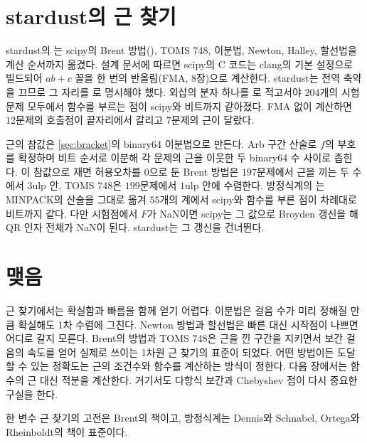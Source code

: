 \section{stardust의 근 찾기}
\label{sec:roots-stardust}

\begin{instardust}
stardust의 는 scipy의 Brent 방법(), TOMS 748, 이분법, Newton, Halley, 할선법을 계산 순서까지 옮겼다. 설계 문서에 따르면 scipy의 C 코드는 clang의 기본 설정으로 빌드되어 $ab+c$ 꼴을 한 번의 반올림(FMA, 8장)으로 계산한다. stardust는 전역 축약을 끄므로 그 자리를 로 명시해야 했다. 외삽의 분자 하나를 로 적고서야 $204$개의 시험 문제 모두에서 함수를 부르는 점이 scipy와 비트까지 같아졌다. FMA 없이 계산하면 $12$문제의 호출점이 끝자리에서 갈리고 $7$문제의 근이 달랐다.
\end{instardust}

\begin{instardust}
근의 참값은 \cref{sec:bracket}의 binary64 이분법으로 만든다. Arb 구간 산술로 $f$의 부호를 확정하며 비트 순서로 이분해 각 문제의 근을 이웃한 두 binary64 수 사이로 좁힌다. 이 참값으로 재면 허용오차를 $0$으로 둔 Brent 방법은 $197$문제에서 근을 끼는 두 수에서 $3$ulp 안, TOMS 748은 $199$문제에서 $1$ulp 안에 수렴한다. 방정식계의 는 MINPACK의 산술을 그대로 옮겨 $55$개의 계에서 scipy와 함수를 부른 점이 차례대로 비트까지 같다. 다만 시험점에서 $F$가 NaN이면 scipy는 그 값으로 Broyden 갱신을 해 QR 인자 전체가 NaN이 된다. stardust는 그 갱신을 건너뛴다.
\end{instardust}

\section{맺음}

근 찾기에서는 확실함과 빠름을 함께 얻기 어렵다. 이분법은 걸음 수가 미리 정해질 만큼 확실해도 1차 수렴에 그친다. Newton 방법과 할선법은 빠른 대신 시작점이 나쁘면 어디로 갈지 모른다. Brent의 방법과 TOMS 748은 근을 낀 구간을 지키면서 보간 걸음의 속도를 얻어 실제로 쓰이는 1차원 근 찾기의 표준이 되었다. 어떤 방법이든 도달할 수 있는 정확도는 근의 조건수와 함수를 계산하는 방식이 정한다. 다음 장에서는 함수의 근 대신 적분을 계산한다. 거기서도 다항식 보간과 Chebyshev 점이 다시 중요한 구실을 한다.

한 변수 근 찾기의 고전은 Brent의 책\cite{brent1973}이고, 방정식계는 Dennis와 Schnabel\cite{dennis1996}, Ortega와 Rheinboldt\cite{ortega2000}의 책이 표준이다.

\chapterreferences
